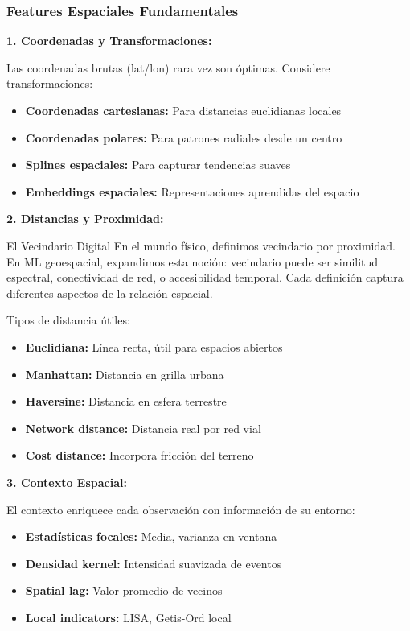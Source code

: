 \documentclass[12pt,a4paper]{article}
\begin{document}
\subsubsection{Features Espaciales Fundamentales}

\textbf{1. Coordenadas y Transformaciones:}

Las coordenadas brutas (lat/lon) rara vez son óptimas. Considere transformaciones:

\begin{itemize}
    \item \textbf{Coordenadas cartesianas:} Para distancias euclidianas locales
    \item \textbf{Coordenadas polares:} Para patrones radiales desde un centro
    \item \textbf{Splines espaciales:} Para capturar tendencias suaves
    \item \textbf{Embeddings espaciales:} Representaciones aprendidas del espacio
\end{itemize}

\textbf{2. Distancias y Proximidad:}

\begin{analogia}{El Vecindario Digital}
En el mundo físico, definimos vecindario por proximidad. En ML geoespacial, expandimos esta noción: vecindario puede ser similitud espectral, conectividad de red, o accesibilidad temporal. Cada definición captura diferentes aspectos de la relación espacial.
\end{analogia}

Tipos de distancia útiles:
\begin{itemize}
    \item \textbf{Euclidiana:} Línea recta, útil para espacios abiertos
    \item \textbf{Manhattan:} Distancia en grilla urbana
    \item \textbf{Haversine:} Distancia en esfera terrestre
    \item \textbf{Network distance:} Distancia real por red vial
    \item \textbf{Cost distance:} Incorpora fricción del terreno
\end{itemize}

\textbf{3. Contexto Espacial:}

El contexto enriquece cada observación con información de su entorno:

\begin{itemize}
    \item \textbf{Estadísticas focales:} Media, varianza en ventana
    \item \textbf{Densidad kernel:} Intensidad suavizada de eventos
    \item \textbf{Spatial lag:} Valor promedio de vecinos
    \item \textbf{Local indicators:} LISA, Getis-Ord local
\end{itemize}
\end{document}

